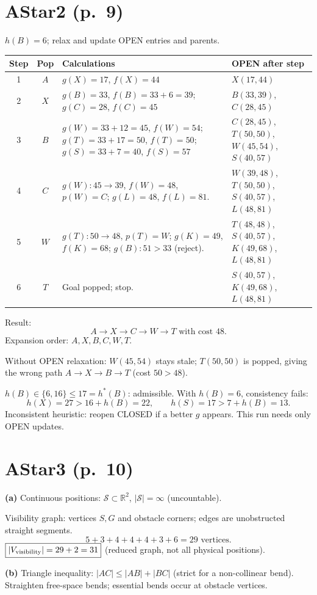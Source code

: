 \documentclass[11pt,a4paper]{article}
\newcommand{\question}[2]{\section*{#1}}
\begin{document}
\newpage
\question{AStar2 (p.\ 9)}{Change $h(B)$ from 16 to 6}
$h(B)=6$; relax and update OPEN entries and parents.
\begin{center}\small\begin{tabular}{c|c|>{\raggedright\arraybackslash}p{6.2cm}|>{\raggedright\arraybackslash}p{4.6cm}}\toprule
Step&Pop&Calculations&OPEN after step\\\midrule
1&$A$&$g(X)=17$, $f(X)=44$&$X(17,44)$\\
2&$X$&$g(B)=33$, $f(B)=33+6=39$; $g(C)=28$, $f(C)=45$&$B(33,39)$, $C(28,45)$\\
3&$B$&$g(W)=33+12=45$, $f(W)=54$; $g(T)=33+17=50$, $f(T)=50$; $g(S)=33+7=40$, $f(S)=57$&$C(28,45)$, $T(50,50)$, $W(45,54)$, $S(40,57)$\\
4&$C$&$g(W):45\to39$, $f(W)=48$, $p(W)=C$; $g(L)=48$, $f(L)=81$.&$W(39,48)$, $T(50,50)$, $S(40,57)$, $L(48,81)$\\
5&$W$&$g(T):50\to48$, $p(T)=W$; $g(K)=49$, $f(K)=68$; $g(B):51>33$ (reject).&$T(48,48)$, $S(40,57)$, $K(49,68)$, $L(48,81)$\\
6&$T$&Goal popped; stop.&$S(40,57)$, $K(49,68)$, $L(48,81)$\\\bottomrule\end{tabular}\normalsize\end{center}
Result:
\[
\boxed{A\to X\to C\to W\to T\text{ with cost }48}.
\]
Expansion order: $A,X,B,C,W,T$.

Without OPEN relaxation: $W(45,54)$ stays stale; $T(50,50)$ is popped, giving the wrong path $A\to X\to B\to T$ (cost $50>48$).

$h(B)\in\{6,16\}\le17=h^*(B)$: admissible. With $h(B)=6$, consistency fails:
\[
h(X)=27>16+h(B)=22,\qquad h(S)=17>7+h(B)=13.
\]
Inconsistent heuristic: reopen CLOSED if a better $g$ appears. This run needs only OPEN updates.

\newpage
\question{AStar3 (p.\ 10)}{Shortest paths among polygonal obstacles}
\textbf{(a)} Continuous positions: $\mathcal S\subset\mathbb R^2$, $\boxed{|\mathcal S|=\infty}$ (uncountable).

Visibility graph: vertices $S,G$ and obstacle corners; edges are unobstructed straight segments.
\[
5+3+4+4+4+3+6=29\text{ vertices}.
\]
$\boxed{|V_{\rm visibility}|=29+2=31}$ (reduced graph, not all physical positions).

\textbf{(b)} Triangle inequality: $|AC|\le|AB|+|BC|$ (strict for a non-collinear bend). Straighten free-space bends; essential bends occur at obstacle vertices.
\end{document}
